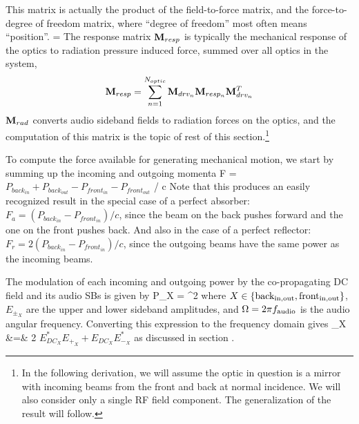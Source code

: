 \documentclass[12pt]{article}
\begin{document}
This matrix is actually the product of the field-to-force matrix, and the force-to-degree of freedom matrix, where ``degree of freedom'' most often means ``position''.
 = \mResp \mRad
\eeq
The response matrix $\mathbf{M}_{resp}$ is typically the mechanical response of the optics to radiation pressure induced force, summed over all optics in the system,
\begin{equation}
\mResp = \sum^{\Nopt}_{n=1} \mDrvn{n} \mRespn{n} \mDrvn{n}^T
\elabel{mResp}
\end{equation}
$\mathbf{M}_{rad}$ converts audio sideband fields to radiation forces on the optics,
 and the computation of this matrix is the topic of rest of this section.\footnote{
 In the following derivation, we will assume the optic in question is a mirror
 with incoming beams from the front and back at normal incidence.
We will also consider only a single RF field component.
The generalization of the result will follow.}

To compute the force available for generating mechanical motion,
 we start by summing up the incoming and outgoing momenta
F = \( P_{back_{in}} + P_{back_{out}} - P_{front_{in}} - P_{front_{out}} \) / c
\eeq
Note that this produces an easily recognized result in the special case of a
 perfect absorber: $F_a = ( P_{back_{in}} - P_{front_{in}} ) / c$,
 since the beam on the back pushes forward and the one on the front pushes back.
And also in the case of a perfect reflector: $F_r = 2 ( P_{back_{in}} - P_{front_{in}} ) / c$,
 since the outgoing beams have the same power as the incoming beams.

The modulation of each incoming and outgoing power by the co-propagating DC field and its audio SBs is given by
 P_X = ^2
\eeq
 where $X \in \left\{ \rm back_{in, out} , {front_{in,out}}  \right\}$,
  $E_{\pm_X}$ are the upper and lower sideband amplitudes,
 and $\Omega = 2 \pi f_{\rm audio}$ is the audio angular frequency.
Converting this expression to the frequency domain gives
_X &=& 2 \( E_{DC_X}^* E_{+_X} + E_{DC_X} E_{-_X}^* \) 
\eeqa
 as discussed in section .
 
\end{document}
